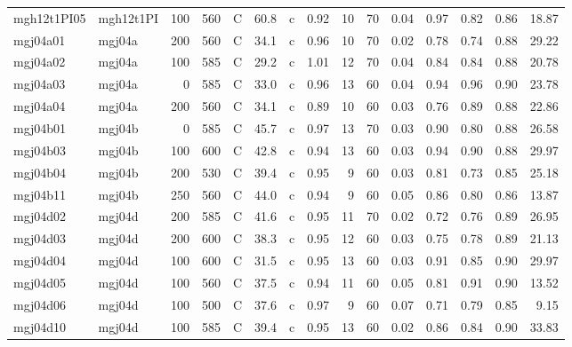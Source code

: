 \documentclass{article}
\begin{document}
\begin{landscape}
\begin{longtable}{llrrlrlrrrrrrrr}
 mgh12t1PI05 &  mgh12t1PI &  100 &  560 &     C &    60.8 &   c &  0.92 &  10 &         70 &  0.04 &  0.97 &  0.82 &  0.86 &   18.87 \\
    mgj04a01 &     mgj04a &  200 &  560 &     C &    34.1 &   c &  0.96 &  10 &         70 &  0.02 &  0.78 &  0.74 &  0.88 &   29.22 \\
    mgj04a02 &     mgj04a &  100 &  585 &     C &    29.2 &   c &  1.01 &  12 &         70 &  0.04 &  0.84 &  0.84 &  0.88 &   20.78 \\
    mgj04a03 &     mgj04a &    0 &  585 &     C &    33.0 &   c &  0.96 &  13 &         60 &  0.04 &  0.94 &  0.96 &  0.90 &   23.78 \\
    mgj04a04 &     mgj04a &  200 &  560 &     C &    34.1 &   c &  0.89 &  10 &         60 &  0.03 &  0.76 &  0.89 &  0.88 &   22.86 \\
    mgj04b01 &     mgj04b &    0 &  585 &     C &    45.7 &   c &  0.97 &  13 &         70 &  0.03 &  0.90 &  0.80 &  0.88 &   26.58 \\
    mgj04b03 &     mgj04b &  100 &  600 &     C &    42.8 &   c &  0.94 &  13 &         60 &  0.03 &  0.94 &  0.90 &  0.88 &   29.97 \\
    mgj04b04 &     mgj04b &  200 &  530 &     C &    39.4 &   c &  0.95 &   9 &         60 &  0.03 &  0.81 &  0.73 &  0.85 &   25.18 \\
    mgj04b11 &     mgj04b &  250 &  560 &     C &    44.0 &   c &  0.94 &   9 &         60 &  0.05 &  0.86 &  0.80 &  0.86 &   13.87 \\
    mgj04d02 &     mgj04d &  200 &  585 &     C &    41.6 &   c &  0.95 &  11 &         70 &  0.02 &  0.72 &  0.76 &  0.89 &   26.95 \\
    mgj04d03 &     mgj04d &  200 &  600 &     C &    38.3 &   c &  0.95 &  12 &         60 &  0.03 &  0.75 &  0.78 &  0.89 &   21.13 \\
    mgj04d04 &     mgj04d &  100 &  600 &     C &    31.5 &   c &  0.95 &  13 &         60 &  0.03 &  0.91 &  0.85 &  0.90 &   29.97 \\
    mgj04d05 &     mgj04d &  100 &  560 &     C &    37.5 &   c &  0.94 &  11 &         60 &  0.05 &  0.81 &  0.91 &  0.90 &   13.52 \\
    mgj04d06 &     mgj04d &  100 &  500 &     C &    37.6 &   c &  0.97 &   9 &         60 &  0.07 &  0.71 &  0.79 &  0.85 &    9.15 \\
    mgj04d10 &     mgj04d &  100 &  585 &     C &    39.4 &   c &  0.95 &  13 &         60 &  0.02 &  0.86 &  0.84 &  0.90 &   33.83 \\

\end{longtable}
\end{landscape}
\end{document}
